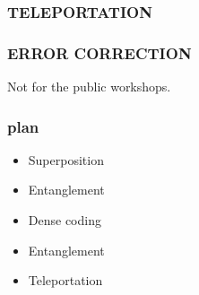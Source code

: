 \documentclass[aspectratio=169]{beamer}
\begin{document}
\begin{frame}
\frametitle{TELEPORTATION}
\end{frame}

\begin{frame}
\frametitle{ERROR CORRECTION}

Not for the public workshops.
\end{frame}

\begin{frame}
\frametitle{plan}

\begin{itemize}
\item Superposition
\item Entanglement
\item Dense coding
\item Entanglement
\item Teleportation
\end{itemize}



\end{frame}
\end{document}
